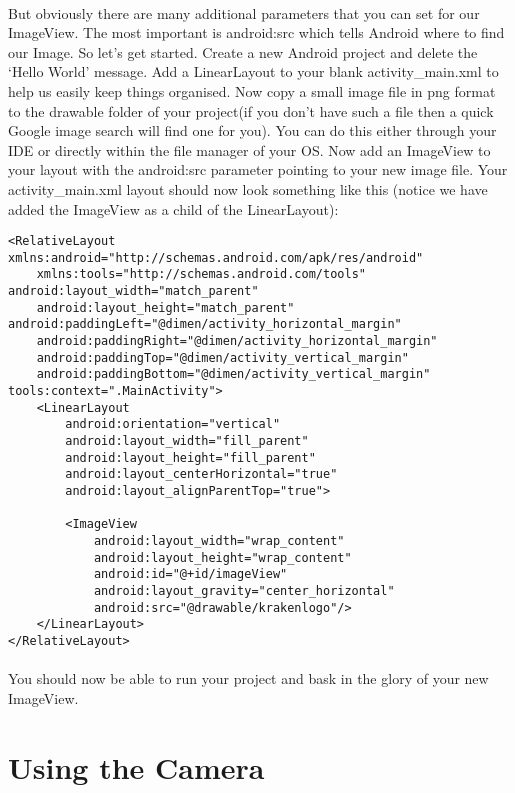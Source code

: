 \paragraph{} But obviously there are many additional parameters that you can set for our ImageView. The most important is android:src which tells Android where to find our Image. So let's get started. Create a new Android project and delete the `Hello World' message. Add a LinearLayout to your blank activity\_main.xml to help us easily keep things organised. Now copy a small image file in png format to the drawable folder of your project(if you don't have such a file then a quick Google image search will find one for you). You can do this either through your IDE or directly within the file manager of your OS. Now add an ImageView to your layout with the android:src parameter pointing to your new image file. Your activity\_main.xml layout should now look something like this (notice we have added the ImageView as a child of the LinearLayout):

\begin{lstlisting}
<RelativeLayout xmlns:android="http://schemas.android.com/apk/res/android"
    xmlns:tools="http://schemas.android.com/tools" android:layout_width="match_parent"
    android:layout_height="match_parent" android:paddingLeft="@dimen/activity_horizontal_margin"
    android:paddingRight="@dimen/activity_horizontal_margin"
    android:paddingTop="@dimen/activity_vertical_margin"
    android:paddingBottom="@dimen/activity_vertical_margin" tools:context=".MainActivity">
    <LinearLayout
        android:orientation="vertical"
        android:layout_width="fill_parent"
        android:layout_height="fill_parent"
        android:layout_centerHorizontal="true"
        android:layout_alignParentTop="true">

        <ImageView
            android:layout_width="wrap_content"
            android:layout_height="wrap_content"
            android:id="@+id/imageView"
            android:layout_gravity="center_horizontal"
            android:src="@drawable/krakenlogo"/>
    </LinearLayout>
</RelativeLayout>
\end{lstlisting}

\paragraph{} You should now be able to run your project and bask in the glory of your new ImageView.

\section{Using the Camera}
